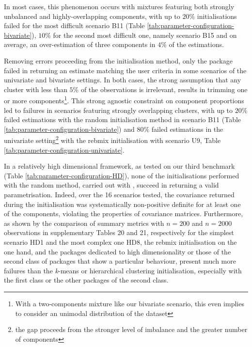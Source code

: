 In most cases, this phenomenon occurs with mixtures featuring both strongly unbalanced and highly-overlapping components, with up to \(20\%\) initialisations failed for the most difficult scenario B11 (Table \ref{tab:parameter-configuration-bivariate}), \(10\%\) for the second most difficult one, namely scenario B15 and on average, an over-estimation of three components in \(4\%\) of the estimations.

Removing errors proceeding from the initialisation method, only the  package failed in returning an estimate matching the user criteria in some scenarios of the univariate and bivariate settings. In both cases, the strong assumption that any cluster with less than \(5\%\) of the observations is irrelevant, results in trimming one or more components\footnote{With a two-components mixture like our bivariate scenario, this even implies to consider an unimodal distribution of the dataset}. This strong agnostic constraint on component proportions led to failures in scenarios featuring strongly overlapping clusters, with up to \(20\%\) failed estimations with the random initialisation method in scenario B11 (Table \ref{tab:parameter-configuration-bivariate}) and \(80\%\) failed estimations in the univariate setting\footnote{the gap proceeds from the stronger level of imbalance and the greater number of components} with the rebmix initialisation with scenario U9, Table \ref{tab:parameter-configuration-univariate}.

In a relatively high dimensional framework, as tested on our third benchmark (Table \ref{tab:parameter-configuration-HD}), none of the initialisations performed with the random method, carried out with , succeed in returning a valid parametrisation. Indeed, over the 16 scenarios tested, the covariance returned during the initialisation was systematically non-positive definite for at least one of the components, violating the properties of covariance matrices.
Furthermore, as shown by the comparison of summary metrics with \(n=200\) and \(n=2000\) observations in supplementary Tables 20 and 21, respectively for the simplest scenario HD1 and the most complex one HD8, the rebmix initialisation on the one hand, and the packages dedicated to high dimensionality or those of the second class of packages that show a particular behaviour, present much more failures than the \emph{k}-means or hierarchical clustering initialisation, especially with the first class or the other packages of the second class.

